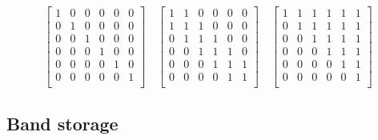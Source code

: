 \[
  \begin{bmatrix}
    1 & 0 & 0 & 0 & 0 & 0 \\
    0 & 1 & 0 & 0 & 0 & 0 \\
    0 & 0 & 1 & 0 & 0 & 0 \\
    0 & 0 & 0 & 1 & 0 & 0 \\
    0 & 0 & 0 & 0 & 1 & 0 \\
    0 & 0 & 0 & 0 & 0 & 1 \\
  \end{bmatrix}
  \quad
  \begin{bmatrix}
    1 & 1 & 0 & 0 & 0 & 0 \\
    1 & 1 & 1 & 0 & 0 & 0 \\
    0 & 1 & 1 & 1 & 0 & 0 \\
    0 & 0 & 1 & 1 & 1 & 0 \\
    0 & 0 & 0 & 1 & 1 & 1 \\
    0 & 0 & 0 & 0 & 1 & 1 \\
  \end{bmatrix}
  \quad
  \begin{bmatrix}
    1 & 1 & 1 & 1 & 1 & 1 \\
    0 & 1 & 1 & 1 & 1 & 1 \\
    0 & 0 & 1 & 1 & 1 & 1 \\
    0 & 0 & 0 & 1 & 1 & 1 \\
    0 & 0 & 0 & 0 & 1 & 1 \\
    0 & 0 & 0 & 0 & 0 & 1 \\
  \end{bmatrix}
\]

\subsection{Band storage} %
\label{sub:band_storage}

